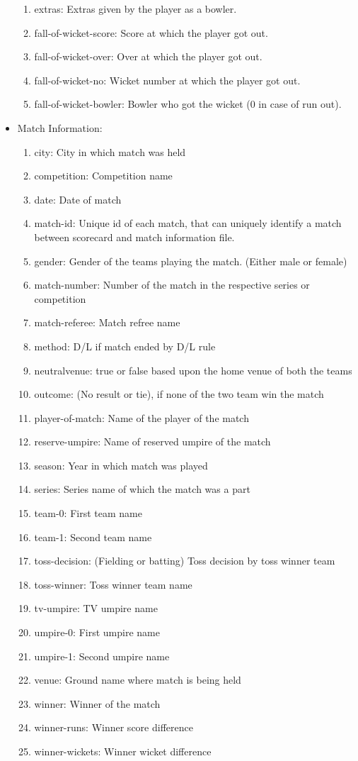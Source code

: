 \documentclass[fleqn,10pt]{wlscirep}
\begin{document}
\begin{itemize}
\begin{enumerate}
    \item extras: Extras given by the player as a bowler.
    \item fall-of-wicket-score: Score at which the player got out.
    \item fall-of-wicket-over: Over at which the player got out.
    \item fall-of-wicket-no: Wicket number at which the player got out.
    \item fall-of-wicket-bowler: Bowler who got the wicket (0 in case of run out).
\end{enumerate}
\item Match Information:
\begin{enumerate}
    \item city: City in which match was held
    \item competition: Competition name
    \item date: Date of match
    \item match-id: Unique id of each match, that can uniquely identify a match between scorecard and match information file.
    \item gender: Gender of the teams playing the match. (Either male or female)
    \item match-number: Number of the match in the respective series or competition
    \item match-referee: Match refree name
    \item method: D/L if match ended by D/L rule
    \item neutralvenue: true or false based upon the home venue of both the teams
    \item outcome: (No result or tie), if none of the two team win the match
    \item player-of-match: Name of the player of the match
    \item reserve-umpire: Name of reserved umpire of the match
    \item season: Year in which match was played
    \item series: Series name of which the match was a part
    \item team-0: First team name
    \item team-1: Second team name
    \item toss-decision: (Fielding or batting) Toss decision by toss winner team
    \item toss-winner: Toss winner team name
    \item tv-umpire: TV umpire name
    \item umpire-0: First umpire name
    \item umpire-1: Second umpire name
    \item venue: Ground name where match is being held
    \item winner: Winner of the match
    \item winner-runs: Winner score difference
    \item winner-wickets: Winner wicket difference
\end{enumerate}
\end{itemize}
\end{document}
